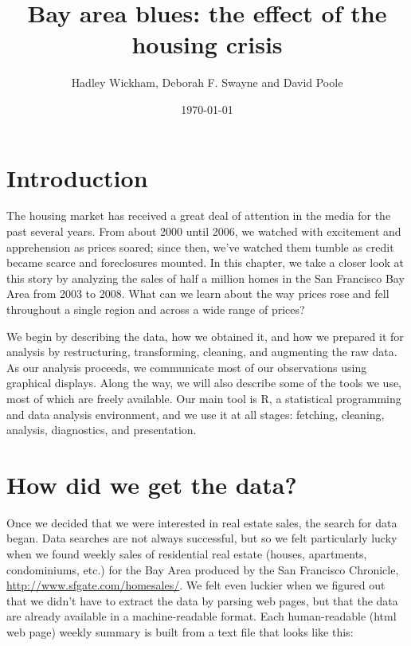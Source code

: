 \documentclass[oneside]{article}
\title{Bay area blues: the effect of the housing crisis}
\author{Hadley Wickham, Deborah F. Swayne and David Poole}
\date{\today}
\begin{document}
\maketitle 

\section{Introduction}

The housing market has received a great deal of attention in the media for the past several years.  From about 2000 until 2006, we watched with excitement and apprehension as prices soared; since then, we've watched them tumble as credit became scarce and foreclosures mounted.   In this chapter, we take a closer look at this story by analyzing the sales of half a million homes in the San Francisco Bay Area from 2003 to 2008.  What can we learn about the way prices rose and fell throughout a single region and across a wide range of prices?


We begin by describing the data, how we obtained it, and how we prepared it for analysis by restructuring, transforming, cleaning, and augmenting the raw data.  As our analysis proceeds, we communicate most of our observations using graphical displays.  Along the way, we will also describe some of the tools we use, most of which are freely available.   Our main tool is R, a statistical programming and data analysis environment, and we use it at all stages: fetching, cleaning, analysis, diagnostics, and presentation.

%

\section{How did we get the data?}


Once we decided that we were interested in real estate sales, the search for data began.  Data searches are not always successful, but so we felt particularly lucky when we found weekly sales of residential real estate (houses, apartments, condominiums, etc.) for the Bay Area produced by the San Francisco Chronicle, \url{http://www.sfgate.com/homesales/}.  We felt even luckier when we figured out that we didn't have to extract the data by parsing web pages, but that the data are already available in a machine-readable format.  Each human-readable (html web page) weekly summary is built from a text file that looks like this: 
\end{document}
